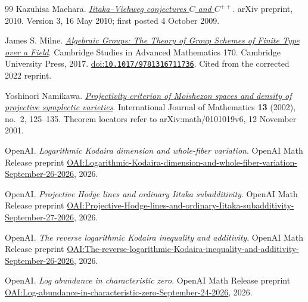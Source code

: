 \begin{thebibliography}{99}
Kazuhisa Maehara.
\emph{\href{https://arxiv.org/abs/0910.0604v3}{{Iitaka--Viehweg} conjectures {$C$} and {$C^{++}$}}}.
arXiv preprint, 2010.
Version 3, 16 May 2010; first posted 4 October 2009.

James S. Milne.
\emph{\href{https://www.jmilne.org/math/Books/iAG2022.pdf}{Algebraic Groups: The Theory of Group Schemes of Finite Type over a Field}}.
Cambridge Studies in Advanced Mathematics 170.
Cambridge University Press, 2017.
\href{https://doi.org/10.1017/9781316711736}{doi:\nolinkurl{10.1017/9781316711736}}.
Cited from the corrected 2022 reprint.

Yoshinori Namikawa.
\emph{\href{https://arxiv.org/abs/math/0101019v6}{Projectivity criterion of {Moishezon} spaces and density of projective symplectic varieties}}.
International Journal of Mathematics \textbf{13} (2002), no.~2, 125--135.
Theorem locators refer to arXiv:math/0101019v6, 12 November 2001.

{\raggedright
{OpenAI}.
\emph{Logarithmic Kodaira dimension and whole-fiber variation}.
OpenAI Math Release preprint
\href{https://github.com/openai/math/blob/main/preprints/Logarithmic-Kodaira-dimension-and-whole-fiber-variation-September-26-2026/paper.pdf}{OAI:Logarithmic-Kodaira-dimension-and-whole-fiber-variation-September-26-2026}, 2026.\par}

{\raggedright
{OpenAI}.
\emph{Projective Hodge lines and ordinary Iitaka subadditivity}.
OpenAI Math Release preprint
\href{https://github.com/openai/math/blob/main/preprints/Projective-Hodge-lines-and-ordinary-Iitaka-subadditivity-September-27-2026/paper.pdf}{OAI:Projective-Hodge-lines-and-ordinary-Iitaka-subadditivity-September-27-2026}, 2026.\par}

{\raggedright
{OpenAI}.
\emph{The reverse logarithmic Kodaira inequality and additivity}.
OpenAI Math Release preprint
\href{https://github.com/openai/math/blob/main/preprints/The-reverse-logarithmic-Kodaira-inequality-and-additivity-September-26-2026/paper.pdf}{OAI:The-reverse-logarithmic-Kodaira-inequality-and-additivity-September-26-2026}, 2026.\par}

{\raggedright
{OpenAI}.
\emph{Log abundance in characteristic zero}.
OpenAI Math Release preprint
\href{https://github.com/openai/math/blob/main/preprints/Log-abundance-in-characteristic-zero-September-24-2026/paper.pdf}{OAI:Log-abundance-in-characteristic-zero-September-24-2026}, 2026.\par}


\end{thebibliography}
